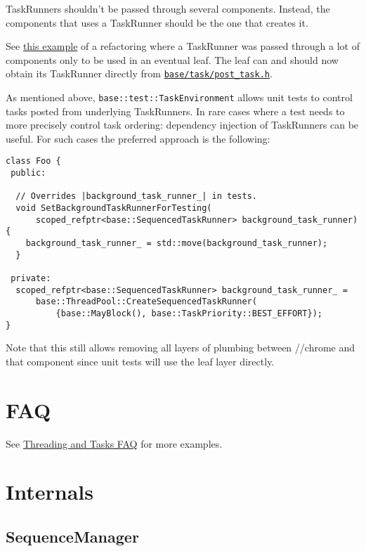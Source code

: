 \documentclass[a4paper,12pt,notitlepage,twoside,openright]{article}
\begin{document}
TaskRunners shouldn't be passed through several components. Instead, the
components that uses a TaskRunner should be the one that creates it.

See \href{https://codereview.chromium.org/2885173002/}{this example} of
a refactoring where a TaskRunner was passed through a lot of components
only to be used in an eventual leaf. The leaf can and should now obtain
its TaskRunner directly from
\href{https://cs.chromium.org/chromium/src/base/task/post_task.h}{\texttt{base/task/post\_task.h}}.

As mentioned above, \texttt{base::test::TaskEnvironment} allows unit
tests to control tasks posted from underlying TaskRunners. In rare cases
where a test needs to more precisely control task ordering: dependency
injection of TaskRunners can be useful. For such cases the preferred
approach is the following:

\begin{verbatim}
class Foo {
 public:

  // Overrides |background_task_runner_| in tests.
  void SetBackgroundTaskRunnerForTesting(
      scoped_refptr<base::SequencedTaskRunner> background_task_runner) {
    background_task_runner_ = std::move(background_task_runner);
  }

 private:
  scoped_refptr<base::SequencedTaskRunner> background_task_runner_ =
      base::ThreadPool::CreateSequencedTaskRunner(
          {base::MayBlock(), base::TaskPriority::BEST_EFFORT});
}
\end{verbatim}

Note that this still allows removing all layers of plumbing between
//chrome and that component since unit tests will use the leaf layer
directly.

\hypertarget{faq}{%
\section{FAQ}\label{faq}}

See \href{threading_and_tasks_faq.md}{Threading and Tasks FAQ} for more
examples.

\hypertarget{internals}{%
\section{Internals}\label{internals}}

\hypertarget{sequencemanager}{%
\subsection{SequenceManager}\label{sequencemanager}}
\end{document}
